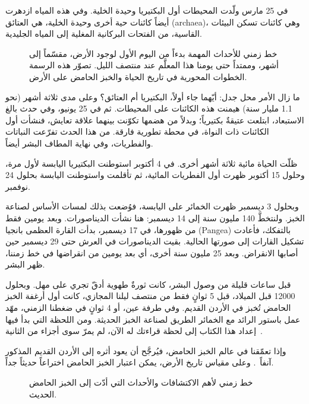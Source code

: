 في 25 مارس ولّدت المحيطات أول البكتيريا وحيدة الخلية. وفي هذه المياه ازدهرت أيضاً كائنات حية أخرى وحيدة الخلية، هي العتائق \textenglish{(archaea)}، وهي كائنات تسكن البيئات القاسية، من الفتحات البركانية المغلية إلى المياه الجليدية.

\begin{figure}[!htb]
  \centering
  
  \caption[الخط الزمني لعلم أحياء الخبز الحامض]{خط زمني للأحداث المهمة بدءاً من اليوم الأول لوجود الأرض، مقسّماً إلى أشهر، وممتداً حتى يومنا هذا المعلَّم عند منتصف الليل. تصوّر هذه الرسمة الخطوات المحورية في تاريخ الحياة والخبز الحامض على الأرض.}%
  \label{fig:planet-timeline}
\end{figure}

ما زال الأمر محل جدل: أيّهما جاء أولاً، البكتيريا أم العتائق؟ وعلى مدى ثلاثة أشهر (نحو 1.1 مليار سنة) هيمنت هذه الكائنات على المحيطات. ثم في 25 يونيو، وفي حدث بالغ الاستبعاد، ابتلعت عتيقةٌ بكتيرياً؛ وبدلاً من هضمها تكوّنت بينهما علاقة تعايش، فنشأت أول الكائنات ذات النواة، في محطة تطورية فارقة. من هذا الحدث تفرّعت النباتات والفطريات، وفي نهاية المطاف البشر أيضاً.

ظلّت الحياة مائية ثلاثة أشهر أخرى. في 4 أكتوبر استوطنت البكتيريا اليابسة لأول مرة، وحلول 15 أكتوبر ظهرت أول الفطريات المائية، ثم تأقلمت واستوطنت اليابسة بحلول 24 نوفمبر.

وبحلول 3 ديسمبر ظهرت الخمائر على اليابسة، فوُضعت بذلك لمسات الأساس لصناعة الخبز. ولنتخطَّ 140 مليون سنة إلى 14 ديسمبر: هنا نشأت الديناصورات. وبعد يومين فقط من ظهورها، في 17 ديسمبر، بدأت القارة العظمى بانجيا (\textenglish{Pangea}) بالتفكك، فأعادت تشكيل القارات إلى صورتها الحالية. بقيت الديناصورات في العرش حتى 29 ديسمبر حين أصابها الانقراض. وبعد 25 مليون سنة أخرى، أي بعد يومين من انقراضها في خط زمننا، ظهر البشر.

قبل ساعات قليلة من وصول البشر، كانت ثورةٌ طهوية أدقّ تجري على مهل. وبحلول \num{12000} قبل الميلاد، قبل 5 ثوانٍ فقط من منتصف ليلنا المجازي، كانت أول أرغفة الخبز الحامض تُخبز في الأردن القديم. وفي طرفة عين، أو 4 ثوانٍ في ضغطنا الزمني، مهّد عمل باستور الرائد مع الخمائر الطريق لصناعة الخبز الحديثة. ومن اللحظة التي بدأ فيها إعداد هذا الكتاب إلى لحظة قراءتك له الآن، لم يمرّ سوى أجزاء من الثانية~\cite{Yong+2017}.

وإذا تعمّقنا في عالم الخبز الحامض، فيُرجَّح أن يعود أثره إلى الأردن القديم المذكور آنفاً~\cite{jordan+bread}. وعلى مقياس تاريخ الأرض، يمكن اعتبار الخبز الحامض اختراعاً حديثاً جداً.

\begin{figure}[!htb]
  \centering
  
  \caption[الخط الزمني لتاريخ الخبز الحامض]{خط زمني لأهم الاكتشافات والأحداث التي أدّت إلى الخبز الحامض الحديث.}%
  \label{fig:sourdough-timeline}
\end{figure}

